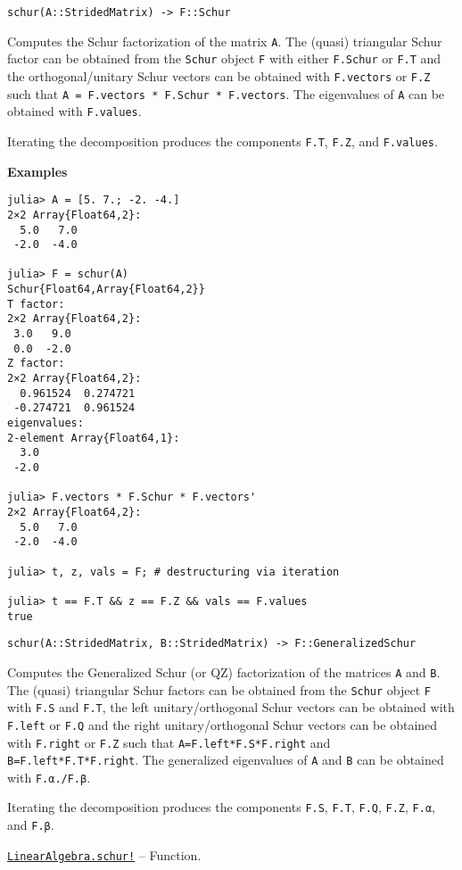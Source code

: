 \begin{adjustwidth}{2em}{0pt}


\begin{verbatim}
schur(A::StridedMatrix) -> F::Schur
\end{verbatim}

Computes the Schur factorization of the matrix \texttt{A}. The (quasi) triangular Schur factor can be obtained from the \texttt{Schur} object \texttt{F} with either \texttt{F.Schur} or \texttt{F.T} and the orthogonal/unitary Schur vectors can be obtained with \texttt{F.vectors} or \texttt{F.Z} such that \texttt{A = F.vectors * F.Schur * F.vectors{\textquotesingle}}. The eigenvalues of \texttt{A} can be obtained with \texttt{F.values}.

Iterating the decomposition produces the components \texttt{F.T}, \texttt{F.Z}, and \texttt{F.values}.

\textbf{Examples}


\begin{verbatim}
julia> A = [5. 7.; -2. -4.]
2×2 Array{Float64,2}:
  5.0   7.0
 -2.0  -4.0

julia> F = schur(A)
Schur{Float64,Array{Float64,2}}
T factor:
2×2 Array{Float64,2}:
 3.0   9.0
 0.0  -2.0
Z factor:
2×2 Array{Float64,2}:
  0.961524  0.274721
 -0.274721  0.961524
eigenvalues:
2-element Array{Float64,1}:
  3.0
 -2.0

julia> F.vectors * F.Schur * F.vectors'
2×2 Array{Float64,2}:
  5.0   7.0
 -2.0  -4.0

julia> t, z, vals = F; # destructuring via iteration

julia> t == F.T && z == F.Z && vals == F.values
true
\end{verbatim}




\begin{lstlisting}
schur(A::StridedMatrix, B::StridedMatrix) -> F::GeneralizedSchur
\end{lstlisting}

Computes the Generalized Schur (or QZ) factorization of the matrices \texttt{A} and \texttt{B}. The (quasi) triangular Schur factors can be obtained from the \texttt{Schur} object \texttt{F} with \texttt{F.S} and \texttt{F.T}, the left unitary/orthogonal Schur vectors can be obtained with \texttt{F.left} or \texttt{F.Q} and the right unitary/orthogonal Schur vectors can be obtained with \texttt{F.right} or \texttt{F.Z} such that \texttt{A=F.left*F.S*F.right{\textquotesingle}} and \texttt{B=F.left*F.T*F.right{\textquotesingle}}. The generalized eigenvalues of \texttt{A} and \texttt{B} can be obtained with \texttt{F.α./F.β}.

Iterating the decomposition produces the components \texttt{F.S}, \texttt{F.T}, \texttt{F.Q}, \texttt{F.Z}, \texttt{F.α}, and \texttt{F.β}.



\end{adjustwidth}
\hypertarget{17231330544698367907}{} 
\hyperlink{17231330544698367907}{\texttt{LinearAlgebra.schur!}}  -- {Function.}

